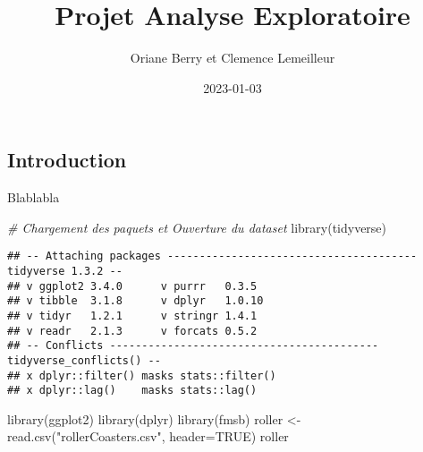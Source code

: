 \documentclass[
]{article}
\title{Projet Analyse Exploratoire}
\author{Oriane Berry et Clemence Lemeilleur}
\date{2023-01-03}
\newenvironment{Shaded}{\begin{snugshade}}{\end{snugshade}}
\newcommand{\AttributeTok}[1]{\textcolor[rgb]{0.77,0.63,0.00}{#1}}
\newcommand{\CommentTok}[1]{\textcolor[rgb]{0.56,0.35,0.01}{\textit{#1}}}
\newcommand{\ConstantTok}[1]{\textcolor[rgb]{0.00,0.00,0.00}{#1}}
\newcommand{\FunctionTok}[1]{\textcolor[rgb]{0.00,0.00,0.00}{#1}}
\newcommand{\NormalTok}[1]{#1}
\newcommand{\OtherTok}[1]{\textcolor[rgb]{0.56,0.35,0.01}{#1}}
\newcommand{\StringTok}[1]{\textcolor[rgb]{0.31,0.60,0.02}{#1}}
\begin{document}
\maketitle

\hypertarget{introduction}{%
\subsection{Introduction}\label{introduction}}

Blablabla

\begin{Shaded}
\begin{Highlighting}[]
\CommentTok{\# Chargement des paquets et Ouverture du dataset}
\FunctionTok{library}\NormalTok{(tidyverse)}
\end{Highlighting}
\end{Shaded}

\begin{verbatim}
## -- Attaching packages --------------------------------------- tidyverse 1.3.2 --
## v ggplot2 3.4.0      v purrr   0.3.5 
## v tibble  3.1.8      v dplyr   1.0.10
## v tidyr   1.2.1      v stringr 1.4.1 
## v readr   2.1.3      v forcats 0.5.2 
## -- Conflicts ------------------------------------------ tidyverse_conflicts() --
## x dplyr::filter() masks stats::filter()
## x dplyr::lag()    masks stats::lag()
\end{verbatim}

\begin{Shaded}
\begin{Highlighting}[]
\FunctionTok{library}\NormalTok{(ggplot2)}
\FunctionTok{library}\NormalTok{(dplyr)}
\FunctionTok{library}\NormalTok{(fmsb)}
\NormalTok{roller }\OtherTok{\textless{}{-}} \FunctionTok{read.csv}\NormalTok{(}\StringTok{"rollerCoasters.csv"}\NormalTok{, }\AttributeTok{header=}\ConstantTok{TRUE}\NormalTok{)}
\NormalTok{roller}
\end{Highlighting}
\end{Shaded}
\end{document}
